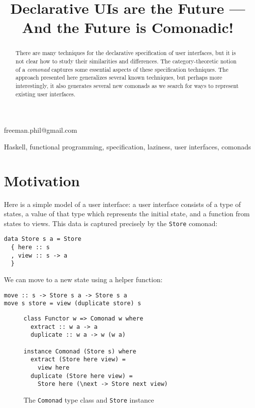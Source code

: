 \documentclass[nocopyrightspace]{sigplanconf}
\begin{document}
\setlength{\pdfpageheight}{\paperheight}
\setlength{\pdfpagewidth}{\paperwidth}

\title{Declarative UIs are the Future --- And the Future is Comonadic!}

           {}
           {freeman.phil@gmail.com}

\maketitle

\begin{abstract}
There are many techniques for the declarative specification of user interfaces, but it is not
clear how to study their similarities and differences.
The category-theoretic notion of a \textit{comonad} captures some essential aspects of
these specification techniques.
The approach presented here generalizes several known techniques, but perhaps more interestingly,
it also generates several new comonads as we search for ways to represent existing user
interfaces.
\end{abstract}

\keywords
Haskell, functional programming, specification, laziness, user interfaces, comonads

\section{Motivation}

Here is a simple model of a user interface: a user interface consists of a type of states,
a value of that type which represents the initial state, and a function from states to views.
This data is captured precisely by the \texttt{Store} comonad:

\begin{verbatim}
data Store s a = Store
  { here :: s
  , view :: s -> a
  }
\end{verbatim}

We can move to a new state using a helper function:

\begin{verbatim}
move :: s -> Store s a -> Store s a
move s store = view (duplicate store) s
\end{verbatim}

\begin{figure}
\begin{verbatim}
class Functor w => Comonad w where
  extract :: w a -> a
  duplicate :: w a -> w (w a)

instance Comonad (Store s) where
  extract (Store here view) =
    view here
  duplicate (Store here view) =
    Store here (\next -> Store next view)
\end{verbatim}
\caption{The \texttt{Comonad} type class and \texttt{Store} instance}
\label{fig-comonad}
\end{figure}
\end{document}
